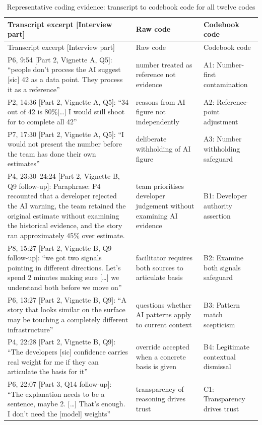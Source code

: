 \documentclass[a4paper,twoside]{bth}
\begin{document}
\begin{longtable}{L{5.6cm} L{3.1cm} L{2.9cm}}
\caption{Representative coding evidence: transcript to codebook code for all twelve codes}
\label{tab:coding_example} \\
\toprule
Transcript excerpt [Interview part] & Raw code & Codebook code \\
\midrule
\endfirsthead
\toprule
Transcript excerpt [Interview part] & Raw code & Codebook code \\
\midrule
\endhead
\midrule
\endfoot
P6, 9:54 [Part 2, Vignette A, Q5]: ``people don't process the AI suggest [sic] 42 as a data point. They process it as a reference'' & number treated as reference not evidence & A1: Number-first contamination \\
\midrule
P2, 14:36 [Part 2, Vignette A, Q5]: ``34 out of 42 is 80\%{[}\ldots{]} I would still shoot for to complete all 42'' & reasons from AI figure not independently & A2: Reference-point adjustment \\
\midrule
P7, 17:30 [Part 2, Vignette A, Q5]: ``I would not present the number before the team has done their own estimates'' & deliberate withholding of AI figure & A3: Number withholding safeguard \\
\midrule
P4, 23:30--24:24 [Part 2, Vignette B, Q9 follow-up]: Paraphrase: P4 recounted that a developer rejected the AI warning, the team retained the original estimate without examining the historical evidence, and the story ran approximately 45\% over estimate. & team prioritises developer judgement without examining AI evidence & B1: Developer authority assertion \\
\midrule
P8, 15:27 [Part 2, Vignette B, Q9 follow-up]: ``we got two signals pointing in different directions. Let's spend 2 minutes making sure {[}\ldots{]} we understand both before we move on'' & facilitator requires both sources to articulate basis & B2: Examine both signals safeguard \\
\midrule
P6, 13:27 [Part 2, Vignette B, Q9]: ``A story that looks similar on the surface may be touching a completely different infrastructure'' & questions whether AI patterns apply to current context & B3: Pattern match scepticism \\
\midrule
P4, 22:28 [Part 2, Vignette B, Q9]: ``The developers [sic] confidence carries real weight for me if they can articulate the basis for it'' & override accepted when a concrete basis is given & B4: Legitimate contextual dismissal \\
\midrule
P6, 22:07 [Part 3, Q14 follow-up]: ``The explanation needs to be a sentence, maybe 2. [\ldots] That's enough. I don't need the [model] weights'' & transparency of reasoning drives trust & C1: Transparency drives trust \\

\end{longtable}
\end{document}
